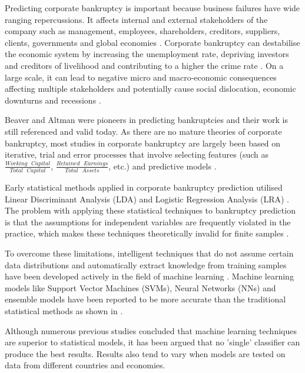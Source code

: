 Predicting corporate bankruptcy is important because business failures have wide ranging repercussions. It affects internal and external stakeholders of the company such as management, employees, shareholders, creditors, suppliers, clients, governments and global economies \cite{shumway2001forecasting}. Corporate bankruptcy can destabilise the economic system by increasing the unemployment rate, depriving investors and creditors of livelihood and contributing to a higher the crime rate  \cite{mbat2013corporate}. On a large scale, it can lead to negative micro and macro‐economic consequences affecting multiple stakeholders and potentially cause social dislocation, economic downturns and recessions \cite{jones2008advances}.

Beaver \cite{beaver1967financial} and Altman \cite{Altman} were pioneers in predicting bankruptcies and their work is still referenced and valid today. As there are no mature theories of corporate bankruptcy, most studies in corporate bankruptcy are largely been based on iterative, trial and error processes that involve selecting features (such as $\frac{Working \mbox{ }Capital}{Total \mbox{ } Capital}$, $\frac{Retained  \mbox{ }Earnings}{Total \mbox{ } Assets}$, etc.) and predictive models \cite{zhou2014bankruptcy}. 

Early statistical methods applied in corporate bankruptcy prediction utilised Linear Discriminant Analysis (LDA) and Logistic Regression Analysis (LRA) \cite{li2009gaussian}. The problem with applying these statistical techniques to bankruptcy prediction is that the assumptions for independent variables are frequently violated in the practice, which makes these techniques theoretically invalid for finite samples \cite{shin2002genetic}. 

To overcome these limitations, intelligent techniques that do not assume certain data distributions and automatically extract knowledge from training samples have been developed actively in the field of machine learning \cite{alaka2018systematic,lessmann2015benchmarking}. Machine learning models like Support Vector Machines (SVMs), Neural Networks (NNs) and ensemble models have been reported to be more accurate than the traditional statistical methods as shown in \cite{barboza2017machine}. 

Although numerous previous studies concluded that machine learning techniques are superior to statistical models, it has been argued that no 'single' classifier can produce the best results. Results also tend to vary when models are tested on data from different countries and economies.

